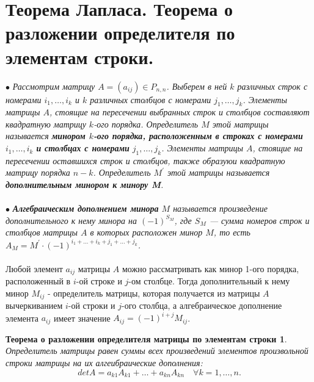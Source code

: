 \section{Теорема Лапласа. Теорема о разложении определителя по элементам строки.}
$\bullet$ \textit{Рассмотрим матрицу $A = (a_{ij}) \in P_{n,n}$. Выберем в ней $k$ различных строк с номерами $i_1,\dots,i_k$ и $k$ различных столбцов с номерами $j_1,\dots,j_k$. Элементы матрицы $A$, стоящие на пересечении выбранных строк и столбцов составляют квадратную матрицу $k$-ого порядка. Определитель $M$ этой матрицы называется \textbf{минором $k$-ого порядка, расположенным в строках с номерами} $i_1,\dots,i_k$ \textbf{и столбцах с номерами} $j_1,\dots,j_k$. Элементы матрицы $A$, стоящие на пересечении оставшихся строк и столбцов, также образуюи квадратную матрицу порядка $n-k$. Определитель $M^{'}$ этой матрицы называется \textbf{дополнительным минором к минору M}.}\\\\
$\bullet$ \textit{\textbf{Алгебраическим дополнением минора} $M$ называется произведение дополнительного к нему минора на $(-1)^{S_M}$, где $S_M$ --- сумма номеров строк и столбцов матрицы $A$ в которых расположен минор $M$, то есть $A_M = M^{'} \cdot (-1)^{i_1+\dots+i_k+j_1+\dots+j_k}$.}\\\\
Любой элемент $a_{ij}$ матрицы $A$ можно рассматривать как минор 1-ого порядка, расположенный в $i$-ой строке и $j$-ом столбце. Тогда дополнительный к нему минор $M_{ij}$ - определитель матрицы, которая получается из матрицы $A$ вычеркиванием $i$-ой строки и $j$-ого столбца, а алгебраическое дополнение элемента $a_{ij}$ имеет значение $A_{ij} = (-1)^{i+j}M_{ij}$.
\newtheorem*{t4_1}{Теорема о разложении определителя матрицы по элементам строки}
\begin{t4_1}
	Определитель матрицы равен суммы всех произведений элементов произвольной строки матрицы на их алгеибраические дополнения:
	$$detA = a_{k1}A_{k1}+\dots+a_{kn}A_{kn} \quad \forall k = 1, \dots, n.$$
\end{t4_1}
